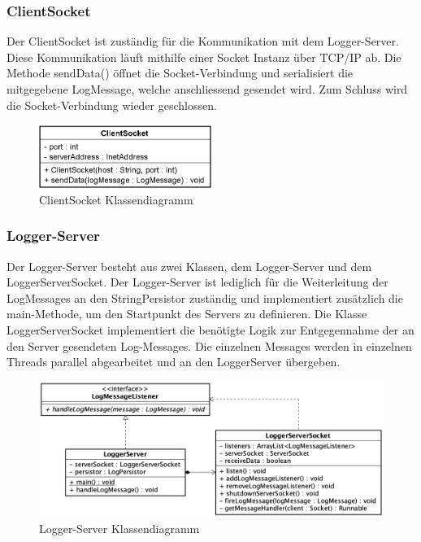 \subsubsection{ClientSocket}
Der ClientSocket ist zuständig für die Kommunikation mit dem Logger-Server. Diese Kommunikation läuft mithilfe einer Socket Instanz über TCP/IP ab. Die Methode sendData() öffnet die Socket-Verbindung und serialisiert die mitgegebene LogMessage, welche anschliessend gesendet wird. Zum Schluss wird die Socket-Verbindung wieder geschlossen.

\begin{figure}[H]
	\centering
	\includegraphics[width=0.5\textwidth]{2_Architektur/Bilder/clientSocket.png}
	\caption{ClientSocket Klassendiagramm}
	\label{fig:ClientSocket Klassendiagramm}
\end{figure}

\newpage
\subsubsection{Logger-Server}
Der Logger-Server besteht aus zwei Klassen, dem Logger-Server und dem LoggerServerSocket. Der Logger-Server ist lediglich für die Weiterleitung der LogMessages an den StringPersistor zuständig und implementiert zusätzlich die main-Methode, um den Startpunkt des Servers zu definieren. 
Die Klasse LoggerServerSocket implementiert die benötigte Logik zur Entgegennahme der an den Server gesendeten Log-Messages. Die einzelnen Messages werden in einzelnen Threads parallel abgearbeitet und an den LoggerServer übergeben. 

\begin{figure}[H]
	\centering
	\includegraphics[width=\textwidth]{2_Architektur/Bilder/loggerServer.png}
	\caption{Logger-Server Klassendiagramm}
	\label{fig:Logger-Server Klassendiagramm}
\end{figure}

